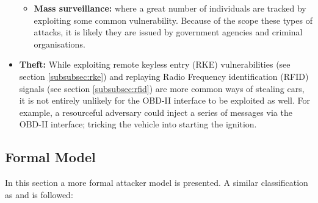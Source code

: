 \begin{itemize}
\begin{itemize}
		\item \textbf{Mass surveillance:} where a great number of individuals are tracked by exploiting some common vulnerability. Because of the scope these types of attacks, it is likely they are issued by government agencies and criminal organisations.
	\end{itemize}
	
	
	\item \textbf{Theft:} While exploiting remote keyless entry (RKE) vulnerabilities (see section \ref{subsubsec:rke}) and replaying Radio Frequency identification (RFID) signals (see section \ref{subsubsec:rfid}) are more common ways of stealing cars, it is not entirely unlikely for the OBD-II interface to be exploited as well. For example, a resourceful adversary could inject a series of messages via the OBD-II interface; tricking the vehicle into starting the ignition.	
\end{itemize}

\subsection{Formal Model}
In this section a more formal attacker model is presented. A similar classification as \cite{Maxim} and \cite{Petit} is followed:

